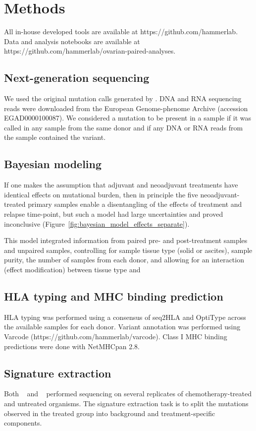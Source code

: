 \section*{Methods}
All in-house developed tools are available at https://github.com/hammerlab. Data and analysis notebooks are available at https://github.com/hammerlab/ovarian-paired-analyses.

\subsection*{Next-generation sequencing}
We used the original mutation calls generated by \cite{Patch_2015}. DNA and RNA sequencing reads were downloaded from the European Genome-phenome Archive (accession EGAD0000100087). We considered a mutation to be present in a sample if it was called in any sample from the same donor and if any DNA or RNA reads from the sample contained the variant.

\subsection*{Bayesian modeling}
If one makes the assumption that adjuvant and neoadjuvant treatments have identical effects on mutational burden, then in principle the five neoadjuvant-treated primary samples enable a disentangling of the effects of treatment and relapse time-point, but such a model had large uncertainties and proved inconclusive (Figure~\ref{fig:bayesian_model_effects_separate}). 

This model integrated information from paired pre- and post-treatment samples and unpaired samples, controlling for sample tissue type (solid or ascites), sample purity, the number of samples from each donor, and allowing for an interaction (effect modification) between tissue type and 
 
\subsection*{HLA typing and MHC binding prediction}
HLA typing was performed using a consensus of seq2HLA\cite{Boegel_2012} and OptiType\cite{Szolek_2014} across the available samples for each donor. Variant annotation was performed using Varcode (https://github.com/hammerlab/varcode). Class I MHC binding predictions were done with NetMHCpan 2.8\cite{Lundegaard_2008}.

\subsection*{Signature extraction}
Both ~\cite{Meier_2014} and ~\cite{Szikriszt_2016} performed sequencing on several replicates of chemotherapy-treated and untreated organisms. The signature extraction task is to split the mutations observed in the treated group into background and treatment-specific components.

